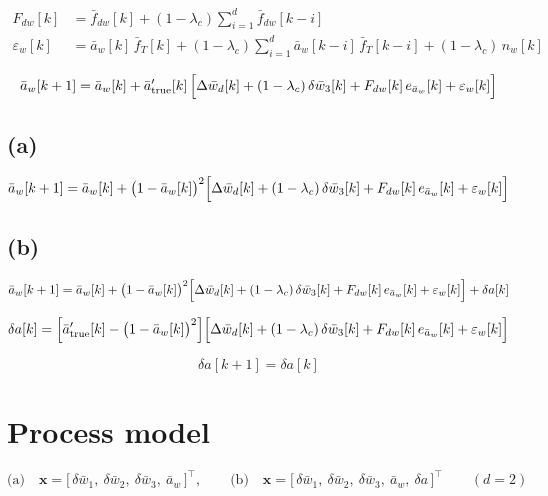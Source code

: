 \documentclass[11pt,a4paper,fontset=none]{ctexart}
\newcommand{\ba}{\bar{a}}
\newcommand{\bw}{\bar{w}}
\begin{document}
\begin{align*}
F_{dw}[k] &= \bar{f}_{dw}[k] + (1-\lambda_c)\sum_{i=1}^{d}\bar{f}_{dw}[k-i] \\
\varepsilon_w[k] &= \ba_w[k]\,\bar{f}_T[k]
  + (1-\lambda_c)\sum_{i=1}^{d}\ba_w[k-i]\,\bar{f}_T[k-i]
  + (1-\lambda_c)\,n_w[k]
\end{align*}

\begin{equation*}
\ba_w[k+1] = \ba_w[k] + \ba'_{\mathrm{true}}[k]\,\Bigl[
  \Delta\bw_d[k] + (1-\lambda_c)\,\delta\bw_3[k]
  + F_{dw}[k]\,e_{\ba_w}[k] + \varepsilon_w[k]\Bigr]
\end{equation*}

\subsection*{(a)}

\begin{equation*}
\ba_w[k+1] = \ba_w[k] + \bigl(1-\ba_w[k]\bigr)^{2}\Bigl[
  \Delta\bw_d[k] + (1-\lambda_c)\,\delta\bw_3[k]
  + F_{dw}[k]\,e_{\ba_w}[k] + \varepsilon_w[k]\Bigr]
\end{equation*}

\subsection*{(b)}

\begin{equation*}
\ba_w[k+1] = \ba_w[k] + \bigl(1-\ba_w[k]\bigr)^{2}\Bigl[
  \Delta\bw_d[k] + (1-\lambda_c)\,\delta\bw_3[k]
  + F_{dw}[k]\,e_{\ba_w}[k] + \varepsilon_w[k]\Bigr] + \delta a[k]
\end{equation*}

\begin{equation*}
\delta a[k]
  = \Bigl[\ba'_{\mathrm{true}}[k] - \bigl(1-\ba_w[k]\bigr)^{2}\Bigr]
     \Bigl[\Delta\bw_d[k] + (1-\lambda_c)\,\delta\bw_3[k]
       + F_{dw}[k]\,e_{\ba_w}[k] + \varepsilon_w[k]\Bigr]
\end{equation*}

\begin{equation*}
\delta a[k+1] = \delta a[k]
\end{equation*}

\section{Process model}

\begin{equation*}
\text{(a)}\quad
\mathbf{x} = \bigl[\,\delta\bw_1,\ \delta\bw_2,\ \delta\bw_3,\ \ba_w\,\bigr]^{\top},
\qquad
\text{(b)}\quad
\mathbf{x} = \bigl[\,\delta\bw_1,\ \delta\bw_2,\ \delta\bw_3,\ \ba_w,\
\delta a\,\bigr]^{\top}
\qquad (d = 2)
\end{equation*}
\end{document}
